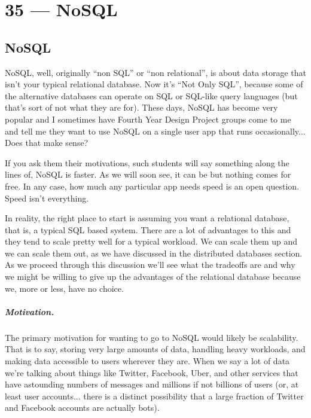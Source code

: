 \documentclass[a4paper]{report}
\begin{document}
\chapter*{35 --- NoSQL}


\section*{NoSQL}

NoSQL, well, originally ``non SQL'' or ``non relational'', is about data storage that isn't your typical relational database. Now it's ``Not Only SQL'', because some of the alternative databases can operate on SQL or SQL-like query languages (but that's sort of not what they are for). These days, NoSQL has become very popular and I sometimes have Fourth Year Design Project groups come to me and tell me they want to use NoSQL on a single user app that runs occasionally... Does that make sense?

If you ask them their motivations, such students will say something along the lines of, NoSQL is faster. As we will soon see, it can be but nothing comes for free. In any case, how much any particular app needs speed is an open question. Speed isn't everything. 

In reality, the right place to start is assuming you want a relational database, that is, a typical SQL based system. There are a lot of advantages to this and they tend to scale pretty well for a typical workload. We can scale them up and we can scale them out, as we have discussed in the distributed databases section. As we proceed through this discussion we'll see what the tradeoffs are and why we might be willing to give up the advantages of the relational database because we, more or less, have no choice.

\paragraph{Motivation.} The primary motivation for wanting to go to NoSQL would likely be scalability. That is to say, storing very large amounts of data, handling heavy workloads, and making data accessible to users wherever they are. When we say a lot of data we're talking about things like Twitter, Facebook, Uber, and other services that have astounding numbers of messages and millions if not billions of users (or, at least user accounts... there is a distinct possibility that a large fraction of Twitter and Facebook accounts are actually bots). 
\end{document}
